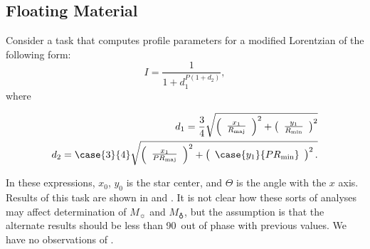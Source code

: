 \begin{article}
\section{Floating Material}
Consider a task that computes profile parameters for 
a modified Lorentzian of the following form:
\begin{equation}
   I = \frac{1}{1 + d_{1}^{P (1 + d_{2} )}}, 
\end{equation}
where
\begin{mathletters}
\begin{eqnarray}
   d_{1} = \frac{3}{4} \sqrt{ \left( \begin{array}{c} 
   \frac{x_{1}}{R_{\rm maj}} 
   \end{array} \right) ^{2} + \left( 
   \begin{array}{c} \frac{y_{1}}{R_{\rm min}} 
   \end{array} \right) ^{2} } \\
   d_{2} = \case{3}{4} \sqrt{ \left( 
   \begin{array}{c} \frac{x_{1}}{P R_{\rm maj}}
   \end{array} \right) ^{2} + \left( 
   \begin{array}{c} \case{y_{1}}{P R_{\rm min}} 
   \end{array} \right) ^{2}.}
\end{eqnarray}
\end{mathletters}
In these expressions, $x_{0}$, $y_{0}$ is the star 
center, and $\Theta$ is the angle with the $x$ axis.
Results of this task are shown in 
%
%
and
.
It is not clear how these sorts of analyses may affect 
determination of $M_{\sun}$ and $M_{\earth}$, but the 
assumption is that the alternate results should be less 
than 90\deg\ out of phase with previous values.  We have 
no observations of .



\end{article}
